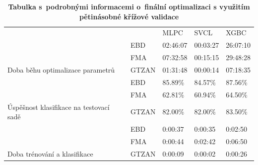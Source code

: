 \begin{table}[H]
	\vskip6pt
    \caption{\textbf{Tabulka s~podrobnými informacemi o~finální optimalizaci s využitím pětinásobné křížové validace}}
    \label{tabulka_final_optimisation_info}  
    \vskip6pt
	\centering
    \begin{tabular}{lllll}
                                                              &                                                  & MLPC                             & SVCL                             & XGBC                             \\ \cline{3-5} 
                                                              & \multicolumn{1}{l|}{EBD}                         & 02:46:07                         & 00:03:27                         & 26:07:10                         \\
                                                              & \multicolumn{1}{l|}{\cellcolor[HTML]{EFEFEF}FMA} & \cellcolor[HTML]{EFEFEF}07:32:58 & \cellcolor[HTML]{EFEFEF}00:15:15 & \cellcolor[HTML]{EFEFEF}29:48:28 \\
    \multirow{-3}{*}{Doba běhu optimalizace parametrů}        & \multicolumn{1}{l|}{GTZAN}                       & 01:31:48                         & 00:00:14                         & 07:18:35                         \\ \hline
                                                              & \multicolumn{1}{l|}{EBD}                         & 85.89\%                          & 84.57\%                          & 87.56\%                          \\
                                                              & \multicolumn{1}{l|}{\cellcolor[HTML]{EFEFEF}FMA} & \cellcolor[HTML]{EFEFEF}62.81\%  & \cellcolor[HTML]{EFEFEF}60.94\%  & \cellcolor[HTML]{EFEFEF}64.50\%  \\
    \multirow{-3}{*}{Úspěšnost klasifikace na testovací sadě} & \multicolumn{1}{l|}{GTZAN}                       & 82.00\%                          & 82.00\%                          & 83.50\%                          \\ \hline
                                                              & \multicolumn{1}{l|}{EBD}                         & 0:00:37                          & 0:00:35                          & 0:02:50                          \\
                                                              & \multicolumn{1}{l|}{\cellcolor[HTML]{EFEFEF}FMA} & \cellcolor[HTML]{EFEFEF}0:00:44  & \cellcolor[HTML]{EFEFEF}0:02:42  & \cellcolor[HTML]{EFEFEF}0:06:50  \\
    \multirow{-3}{*}{Doba trénování a klasifikace}            & \multicolumn{1}{l|}{GTZAN}                       & 0:00:09                          & 0:00:02                          & 0:00:26                         
    \end{tabular}
\end{table}

